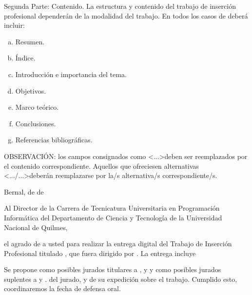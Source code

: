 Segunda Parte: Contenido.
La estructura y contenido del trabajo de inserción profesional dependerán de la
modalidad del trabajo. En todos los casos de deberá incluir:
\begin{enumerate}[a.]
\item Resumen.
\item Índice.
\item Introducción e importancia del tema.
\item Objetivos.
\item Marco teórico.
\item Conclusiones.
\item Referencias bibliográficas.
\end{enumerate}

\newpage
{}

OBSERVACIÓN: los campos consignados como \textless...\textgreater deben ser
reemplazados por el contenido correspondiente. Aquellos que ofreciesen
alternativas \textless.../...\textgreater deberán reemplazarse por la/s
alternativa/s correspondiente/s.

\begin{flushright}
Bernal,  de  de 
\end{flushright}

Al Director de la Carrera de Tecnicatura Universitaria en Programación Informática del
Departamento de Ciencia y Tecnología de la
Universidad Nacional de Quilmes,


\hrulefill

 el agrado de  a
usted para realizar la entrega digital del Trabajo
de Inserción Profesional titulado
, que fuera dirigido por 
. La entrega incluye

Se propone como posibles jurados titulares a , 
y  y como posibles jurados
suplentes a  y .
del jurado, y de su expedición sobre el trabajo. Cumplido esto, coordinaremos la fecha
de defensa oral.

